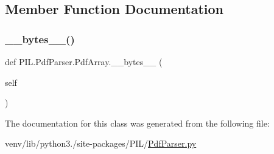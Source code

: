 \subsection{Member Function Documentation}
\mbox{\label{classPIL_1_1PdfParser_1_1PdfArray_a7be0ddbd4027eb8bfce774f209859600}} 
\subsubsection{\texorpdfstring{\+\_\+\+\_\+bytes\+\_\+\+\_\+()}{\_\_bytes\_\_()}}
{\footnotesize\ttfamily def P\+I\+L.\+Pdf\+Parser.\+Pdf\+Array.\+\_\+\+\_\+bytes\+\_\+\+\_\+ (\begin{DoxyParamCaption}\item[{}]{self }\end{DoxyParamCaption})}



The documentation for this class was generated from the following file\+:\begin{DoxyCompactItemize}
\item 
venv/lib/python3./site-\/packages/\+P\+I\+L/\hyperlink{PdfParser_8py}{Pdf\+Parser.\+py}\end{DoxyCompactItemize}
